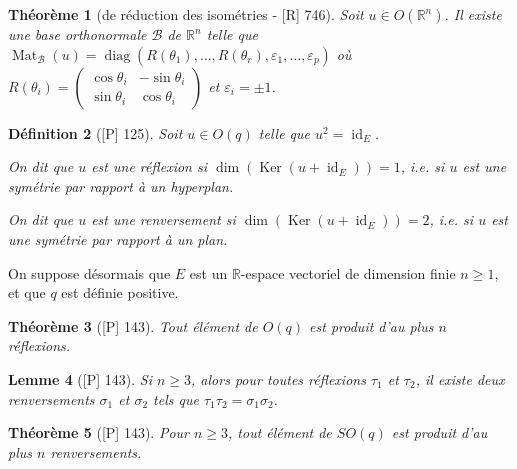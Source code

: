 \documentclass[10pt, a4paper, parskip=full, twoside, twocolumn]{report}
\newtheorem{definition}{Définition}
\newtheorem{theorem}[definition]{Théorème}
\newtheorem{lemma}[definition]{Lemme}
\newcommand{\IR}{\mathbb{R}}
\newcommand{\IRn}{\mathbb{R}^n}
\DeclareMathOperator{\Ker}{Ker}
\DeclareMathOperator{\Mat}{Mat}
\DeclareMathOperator{\id}{id}
\DeclareMathOperator{\diag}{diag}
\begin{document}
\begin{theorem}[de réduction des isométries - \textnormal{[R] 746}]
	Soit $u\in O(\IRn)$. Il existe une base orthonormale $\mathcal{B}$ de $\IRn$ telle que $\Mat_{\mathcal{B}}(u)=\diag(R(\theta_1),\dots,R(\theta_r),\varepsilon_1,\dots,\varepsilon_p)$
	où $R(\theta_i) = \begin{pmatrix}
		\cos \theta_i & -\sin \theta_i \\
		\sin \theta_i & \cos \theta_i
	\end{pmatrix}$ et $\varepsilon_i = \pm 1$.
\end{theorem}

\begin{definition}[\textnormal{[P] 125}]
	Soit $u\in O(q)$ telle que $u^2 = \id_E$.
	
	On dit que $u$ est une \emph{réflexion} si $\dim(\Ker(u+\id_E)) = 1$, \emph{i.e.} si $u$ est une symétrie par rapport à un hyperplan.
	
	On dit que $u$ est une \emph{renversement} si $\dim(\Ker(u+\id_E)) = 2$, \emph{i.e.} si $u$ est une symétrie par rapport à un plan.
\end{definition}


\begin{tcolorbox}[
    breakable, %
    colback=developpement, %
    colframe=gray!0!black, %
    boxrule=0pt, %
    arc=1mm, %
	boxsep=0pt,
	left=0pt, right=0pt, top=0pt, bottom=0pt
]
\textcolor{paragraphtext}{On suppose désormais que $E$ est un $\IR$-espace vectoriel de dimension finie $n\geq 1$, et que $q$ est définie positive.}
\begin{theorem}[\textnormal{[P] 143}]
	\label{108dev21}
	Tout élément de $O(q)$ est produit d'au plus $n$ réflexions.
\end{theorem}

\begin{lemma}[\textnormal{[P] 143}]
	\label{108dev22}
	Si $n\geq 3$, alors pour toutes réflexions $\tau_1$ et $\tau_2$, il existe deux renversements $\sigma_1$ et $\sigma_2$ tels que $\tau_1\tau_2 = \sigma_1\sigma_2$.
\end{lemma}

\begin{theorem}[\textnormal{[P] 143}]
	\label{109dev23}
	Pour $n\geq 3$, tout élément de $SO(q)$ est produit d'au plus $n$ renversements.
\end{theorem}
\end{tcolorbox}
\end{document}
